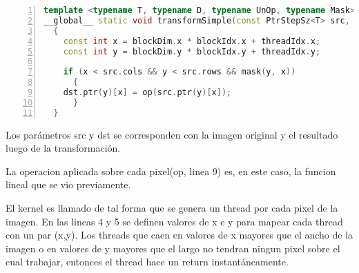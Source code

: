 \documentclass[a4paper,10pt]{report}
\begin{document}
\begin{lstlisting}[frame=bt,caption={gpu/include/opencv2/gpu/device/detail/transform\_detail.hpp},
columns=fullflexible,numbers=left,backgroundcolor=\color{LemonChiffon1},basicstyle=\footnotesize,keywordstyle=\ttfamily\footnotesize,language=C++,stringstyle=\ttfamily,breaklines=true,xleftmargin=0.5em,xrightmargin=0pt,aboveskip=\bigskipamount,belowskip=\bigskipamount]
template <typename T, typename D, typename UnOp, typename Mask>
__global__ static void transformSimple(const PtrStepSz<T> src, PtrStep<D> dst, const Mask mask, const UnOp op)
  {
    const int x = blockDim.x * blockIdx.x + threadIdx.x;
    const int y = blockDim.y * blockIdx.y + threadIdx.y;

    if (x < src.cols && y < src.rows && mask(y, x))
      {
	dst.ptr(y)[x] = op(src.ptr(y)[x]);
      }
  }

\end{lstlisting}


Los parámetros src y dst se corresponden con la imagen original y el resultado luego de la transformación.

La operacion aplicada sobre cada pixel(op, linea 9) es, en este caso, la funcion lineal que se vio previamente.

El kernel es llamado de tal forma que se genera un thread por cada pixel de la imagen.
En las lineas 4 y 5 se definen valores de x e y para mapear cada thread con un par (x,y).
Los threads que caen en valores de x mayores que el ancho de la imagen o en valores de y mayores que el largo no tendran ningun pixel sobre el cual trabajar, entonces el thread hace un return instantáneamente.




\end{document}
